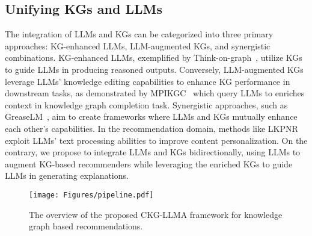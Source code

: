 \vspace{-0.2cm}\subsection{Unifying KGs and LLMs} 
The integration of LLMs and KGs can be categorized into three primary approaches: KG-enhanced LLMs, LLM-augmented KGs, and synergistic combinations. 
KG-enhanced LLMs, exemplified by Think-on-graph~\cite{think-on-graph}, utilize KGs to guide LLMs in producing reasoned outputs. Conversely, LLM-augmented KGs leverage LLMs' knowledge editing capabilities to enhance KG performance in downstream tasks, as demonstrated by MPIKGC~\cite{mpikgc} which query LLMs to enriches context in knowledge graph completion task. 
Synergistic approaches, such as GreaseLM~\cite{GreaseLM}, aim to create frameworks where LLMs and KGs mutually enhance each other's capabilities. In the recommendation domain, methods like LKPNR~\cite{lkpnr} exploit LLMs' text processing abilities to improve content personalization. On the contrary, we propose to integrate LLMs and KGs bidirectionally, using LLMs to augment KG-based recommenders while leveraging the enriched KGs to guide LLMs in generating explanations.

\begin{figure*}[t]
\vspace{-0.4cm}
 \centering
  \texttt{[image: Figures/pipeline.pdf]}
  \caption{The overview of the proposed CKG-LLMA framework for knowledge graph based recommendations.}
  \vspace{-0.4cm}
  \label{fig:pipeline}
  \vspace{-0.2cm}
\end{figure*}

\vspace{-0.2cm}